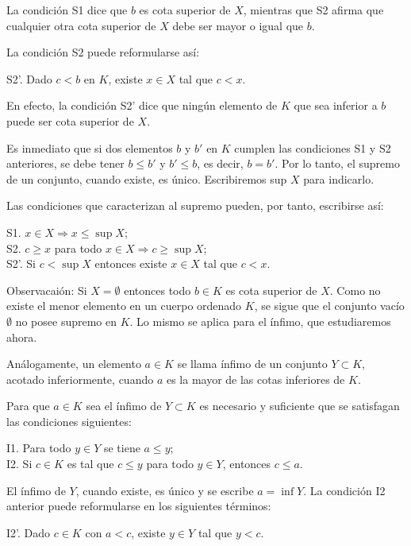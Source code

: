 \documentclass[12pt,oneside]{book}
\begin{document}
La condición S1 dice que \( b \) es cota superior de \( X \), mientras que S2 afirma que cualquier otra cota superior de \( X \) debe ser mayor o igual que \( b \).

La condición S2 puede reformularse así:

S2'. Dado \( c < b \) en \( K \), existe \( x \in X \) tal que \( c < x \).

En efecto, la condición S2' dice que ningún elemento de \( K \) que sea inferior a \( b \) puede ser cota superior de \( X \).

Es inmediato que si dos elementos \( b \) y \( b' \) en \( K \) cumplen las condiciones S1 y S2 anteriores, se debe tener \( b \leq b' \) y \( b' \leq b \), es decir, \( b = b' \). Por lo tanto, el supremo de un conjunto, cuando existe, es único. Escribiremos sup \( X \) para indicarlo.

Las condiciones que caracterizan al supremo pueden, por tanto, escribirse así:

S1. \( x \in X \Rightarrow x \leq \sup X \);\\
S2. \( c \geq x \) para todo \( x \in X \Rightarrow c \geq \sup X \);\\
S2'. Si \( c < \sup X \) entonces existe \( x \in X \) tal que \( c < x \).

Observacaión: Si \( X = \emptyset \) entonces todo \( b \in K \) es cota superior de \( X \). Como no existe el menor elemento en un cuerpo ordenado \( K \), se sigue que el conjunto vacío \( \emptyset \) no posee supremo en \( K \). Lo mismo se aplica para el ínfimo, que estudiaremos ahora.

Análogamente, un elemento \( a \in K \) se llama ínfimo de un conjunto \( Y \subset K \), acotado inferiormente, cuando \( a \) es la mayor de las cotas inferiores de \( K \).

Para que \( a \in K \) sea el ínfimo de \( Y \subset K \) es necesario y suficiente que se satisfagan las condiciones siguientes:

I1. Para todo \( y \in Y \) se tiene \( a \leq y \);\\
I2. Si \( c \in K \) es tal que \( c \leq y \) para todo \( y \in Y \), entonces \( c \leq a \).

El ínfimo de \( Y \), cuando existe, es único y se escribe \( a = \inf Y \).  
La condición I2 anterior puede reformularse en los siguientes términos:

I2’. Dado \( c \in K \) con \( a < c \), existe \( y \in Y \) tal que \( y < c \).
\end{document}
